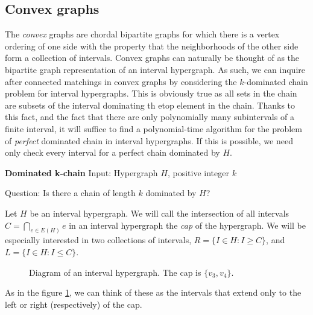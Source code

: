 \subsection{Convex graphs}
The {\it convex} graphs are chordal bipartite graphs for which there is a vertex ordering of one side with the property that the neighborhoods of the other side form a collection of intervals.  
%
Convex graphs can naturally be thought of as the bipartite graph representation of an interval hypergraph.   
%
As such, we can inquire after connected matchings in convex graphs by considering the $k$-dominated chain problem for interval hypergraphs.
%
This is obviously true as all sets in the chain are subsets of the interval dominating th etop element in the chain.  Thanks to this fact, and the fact that there are only polynomially many subintervals of a finite interval, it will suffice to find a polynomial-time algorithm for the problem of {\it perfect} dominated chain in interval hypergraphs.  If this is possible, we need only check every interval for a perfect chain dominated by $H$.
\begin{framed}\noindent\textbf{Dominated k-chain}
	\vskip 0.5cm
	\noindent Input: Hypergraph $H$, positive integer $k$
	
	\noindent Question: Is there a chain of length $k$ dominated by $H$?
\end{framed}

Let $H$ be an interval hypergraph.  We will call the intersection of all intervals $C = \bigcap_{e \in E(H)} e$ in an interval hypergraph the {\it cap} of the hypergraph.  
%
We will be especially interested in two collections of intervals, $R = \{I \in H : I \geq C\}$, and $L = \{I \in H : I \leq C\}$.
%
\begin{figure}
	\begin{center}
	
	\end{center}
	\caption{Diagram of an interval hypergraph.  The cap is $\{v_3,v_4\}$.}
	\label{interval_diag}
\end{figure}
  As in the figure \ref{interval_diag}, we can think of these as the intervals that extend only to the left or right (respectively) of the cap.

